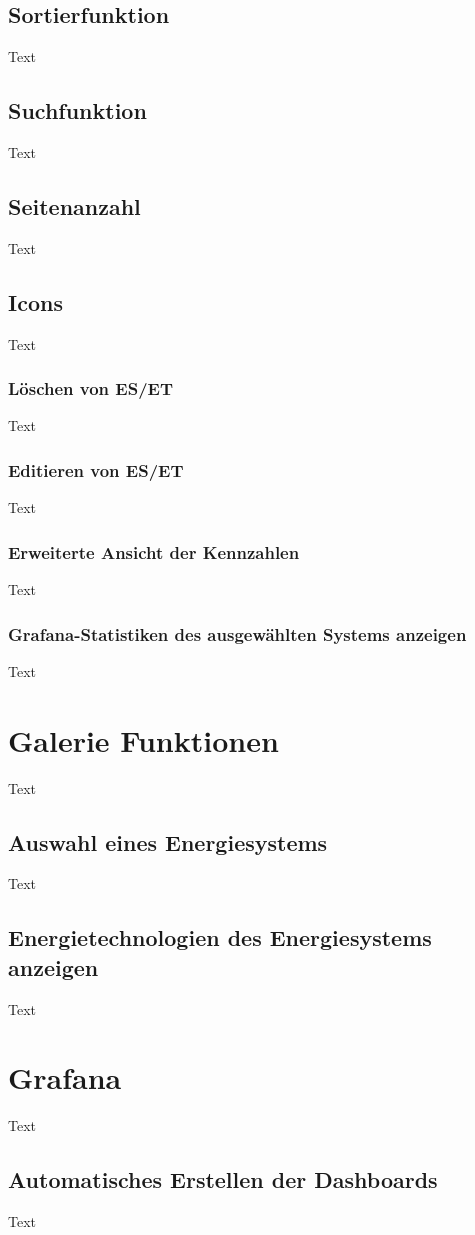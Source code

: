 \subsection{Sortierfunktion}
Text
\subsection{Suchfunktion}
Text
\subsection{Seitenanzahl}
Text
\subsection{Icons}
Text
\subsubsection{Löschen von ES/ET}
Text
\subsubsection{Editieren von ES/ET}
Text
\subsubsection{Erweiterte Ansicht der Kennzahlen}
Text
\subsubsection{Grafana-Statistiken des ausgewählten Systems anzeigen}
Text


\section{Galerie Funktionen}
Text
\subsection{Auswahl eines Energiesystems}
Text
\subsection{Energietechnologien des Energiesystems anzeigen}
Text


\section{Grafana}
Text
\subsection{Automatisches Erstellen der Dashboards}
Text
